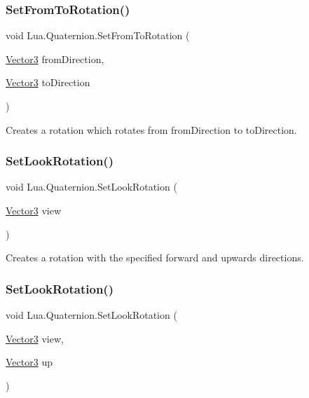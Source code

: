 \subsubsection{\texorpdfstring{SetFromToRotation()}{SetFromToRotation()}}
{\footnotesize\ttfamily void Lua.\+Quaternion.\+Set\+From\+To\+Rotation (\begin{DoxyParamCaption}\item[{\mbox{\hyperlink{class_lua_1_1_vector3}{Vector3}}}]{from\+Direction,  }\item[{\mbox{\hyperlink{class_lua_1_1_vector3}{Vector3}}}]{to\+Direction }\end{DoxyParamCaption})}



Creates a rotation which rotates from from\+Direction to to\+Direction. 

\mbox{\label{class_lua_1_1_quaternion_aab942db162b73214d4b563bd6a49bad4}} 
\subsubsection{\texorpdfstring{SetLookRotation()}{SetLookRotation()}\hspace{0.1cm}{\footnotesize\ttfamily [1/2]}}
{\footnotesize\ttfamily void Lua.\+Quaternion.\+Set\+Look\+Rotation (\begin{DoxyParamCaption}\item[{\mbox{\hyperlink{class_lua_1_1_vector3}{Vector3}}}]{view }\end{DoxyParamCaption})}



Creates a rotation with the specified forward and upwards directions. 

\mbox{\label{class_lua_1_1_quaternion_a13062d4cdfe3635c74f2e57c893b6e2f}} 
\subsubsection{\texorpdfstring{SetLookRotation()}{SetLookRotation()}\hspace{0.1cm}{\footnotesize\ttfamily [2/2]}}
{\footnotesize\ttfamily void Lua.\+Quaternion.\+Set\+Look\+Rotation (\begin{DoxyParamCaption}\item[{\mbox{\hyperlink{class_lua_1_1_vector3}{Vector3}}}]{view,  }\item[{\mbox{\hyperlink{class_lua_1_1_vector3}{Vector3}}}]{up }\end{DoxyParamCaption})}



